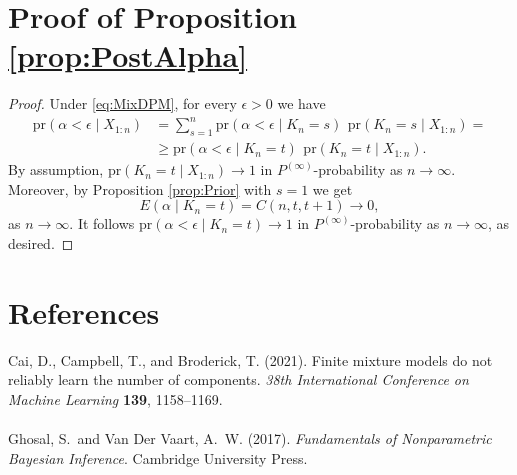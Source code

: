 \documentclass[12pt]{article}
\begin{document}
\section{Proof of Proposition \ref{prop:PostAlpha}}
\begin{proof}
Under \eqref{eq:MixDPM}, for every $\epsilon > 0$ we have
\begin{align*}
\text{pr}(\alpha < \epsilon \mid X_{1:n}) &= \sum_{s=1}^{n} \text{pr}(\alpha < \epsilon \mid  K_n=s) \,\ \text{pr}(K_n=s \mid X_{1:n}) =\\
&\ge \text{pr}(\alpha < \epsilon \mid K_n=t) \,\ \text{pr}(K_n=t \mid X_{1:n}).
\end{align*}
By assumption, $\text{pr}(K_n=t \mid X_{1:n}) \to 1$ in $P^{(\infty)}$-probability as $n \to \infty$. Moreover, by Proposition \ref{prop:Prior} with $s = 1$ we get
\[
E(\alpha \mid K_n=t) = C(n, t, t+1) \rightarrow 0,
\]
as $n \to \infty$. It follows $\text{pr}(\alpha < \epsilon \mid K_n=t) \to 1$ in $P^{(\infty)}$-probability as $n \to \infty$, as desired.
\end{proof}

\section*{References}

Cai, D., Campbell, T., and Broderick, T. (2021). Finite mixture models do not reliably 
\hspace*{0.2cm} learn the number of components. \emph{38th International Conference on Machine Learning} \hspace*{0.2cm} {\bf{139}}, 1158--1169.\\
\\
Ghosal, S.\ and Van Der Vaart, A.\ W. (2017). \emph{Fundamentals of Nonparametric Bayesian \hspace*{0.2cm} Inference}. Cambridge
University Press.
\end{document}
